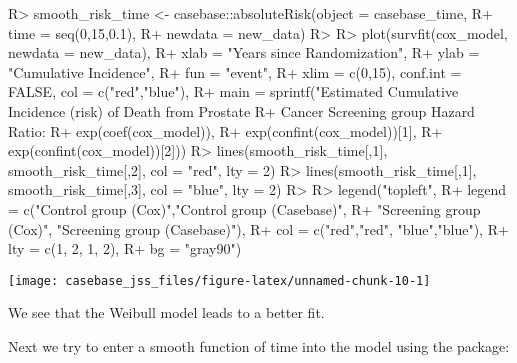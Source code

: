 \documentclass[article]{jss}
\begin{document}
\begin{CodeChunk}

\begin{CodeInput}
R> smooth_risk_time <- casebase::absoluteRisk(object = casebase_time, 
R+                                           time = seq(0,15,0.1), 
R+                                           newdata = new_data)
R> 
R> plot(survfit(cox_model, newdata = new_data),
R+      xlab = "Years since Randomization", 
R+      ylab = "Cumulative Incidence", 
R+      fun = "event",
R+      xlim = c(0,15), conf.int = FALSE, col = c("red","blue"), 
R+      main = sprintf("Estimated Cumulative Incidence (risk) of Death from Prostate 
R+                     Cancer Screening group Hazard Ratio: %
R+                     exp(coef(cox_model)), 
R+                     exp(confint(cox_model))[1], 
R+                     exp(confint(cox_model))[2]))
R> lines(smooth_risk_time[,1], smooth_risk_time[,2], col = "red", lty = 2)
R> lines(smooth_risk_time[,1], smooth_risk_time[,3], col = "blue", lty = 2)
R> 
R> legend("topleft", 
R+        legend = c("Control group (Cox)","Control group (Casebase)",
R+                   "Screening group (Cox)", "Screening group (Casebase)"), 
R+        col = c("red","red", "blue","blue"),
R+        lty = c(1, 2, 1, 2), 
R+        bg = "gray90")
\end{CodeInput}


\begin{center}\texttt{[image: casebase\_jss\_files/figure-latex/unnamed-chunk-10-1]} \end{center}

\end{CodeChunk}

We see that the Weibull model leads to a better fit.

Next we try to enter a smooth function of time into the model using the
 package:
\end{document}

